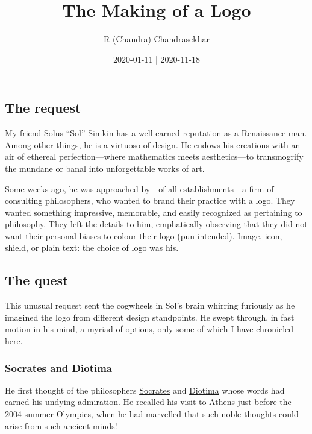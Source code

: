 \documentclass[
  a4paper,
]{article}
\title{The Making of a Logo}
\author{R (Chandra) Chandrasekhar}
\date{2020-01-11 | 2020-11-18}
\begin{document}
\maketitle




\hypertarget{the-request}{%
\subsection{The request}\label{the-request}}

My friend Solus ``Sol'' Simkin has a well-earned reputation as a
\href{https://www.thefreedictionary.com/renaissance+man}{Renaissance
man}. Among other things, he is a virtuoso of design. He endows his
creations with an air of ethereal perfection---where mathematics meets
aesthetics---to transmogrify the mundane or banal into unforgettable
works of art.

Some weeks ago, he was approached by---of all establishments---a firm of
consulting philosophers, who wanted to brand their practice with a logo.
They wanted something impressive, memorable, and easily recognized as
pertaining to philosophy. They left the details to him, emphatically
observing that they did not want their personal biases to colour their
logo (pun intended). Image, icon, shield, or plain text: the choice of
logo was his.

\hypertarget{the-quest}{%
\subsection{The quest}\label{the-quest}}

This unusual request sent the cogwheels in Sol's brain whirring
furiously as he imagined the logo from different design standpoints. He
swept through, in fast motion in his mind, a myriad of options, only
some of which I have chronicled here.

\hypertarget{socrates-and-diotima}{%
\subsubsection{Socrates and Diotima}\label{socrates-and-diotima}}

He first thought of the philosophers
\href{https://en.wikipedia.org/wiki/Socrates}{Socrates} and
\href{https://en.wikipedia.org/wiki/Diotima_of_Mantinea}{Diotima} whose
words had earned his undying admiration. He recalled his visit to Athens
just before the 2004 summer Olympics, when he had marvelled that such
noble thoughts could arise from such ancient minds!
\end{document}
